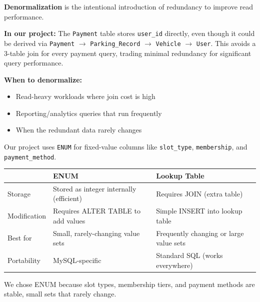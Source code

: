 \documentclass[12pt,a4paper]{article}
\begin{document}
\begin{questionbox}
\end{questionbox}
\begin{answerbox}
\textbf{Denormalization} is the intentional introduction of redundancy to improve read performance.

\textbf{In our project:} The \texttt{Payment} table stores \texttt{user\_id} directly, even though it could be derived via \texttt{Payment} $\rightarrow$ \texttt{Parking\_Record} $\rightarrow$ \texttt{Vehicle} $\rightarrow$ \texttt{User}. This avoids a 3-table join for every payment query, trading minimal redundancy for significant query performance.

\textbf{When to denormalize:}
\begin{itemize}[nosep]
    \item Read-heavy workloads where join cost is high
    \item Reporting/analytics queries that run frequently
    \item When the redundant data rarely changes
\end{itemize}
\end{answerbox}

\begin{questionbox}
\end{questionbox}
\begin{answerbox}
Our project uses \texttt{ENUM} for fixed-value columns like \texttt{slot\_type}, \texttt{membership}, and \texttt{payment\_method}.

\begin{longtable}{@{}lp{5.5cm}p{5.5cm}@{}}
\toprule
& \textbf{ENUM} & \textbf{Lookup Table} \\
\midrule
Storage & Stored as integer internally (efficient) & Requires JOIN (extra table) \\
Modification & Requires ALTER TABLE to add values & Simple INSERT into lookup table \\
Best for & Small, rarely-changing value sets & Frequently changing or large value sets \\
Portability & MySQL-specific & Standard SQL (works everywhere) \\
\bottomrule
\end{longtable}

We chose ENUM because slot types, membership tiers, and payment methods are stable, small sets that rarely change.
\end{answerbox}
\end{document}
